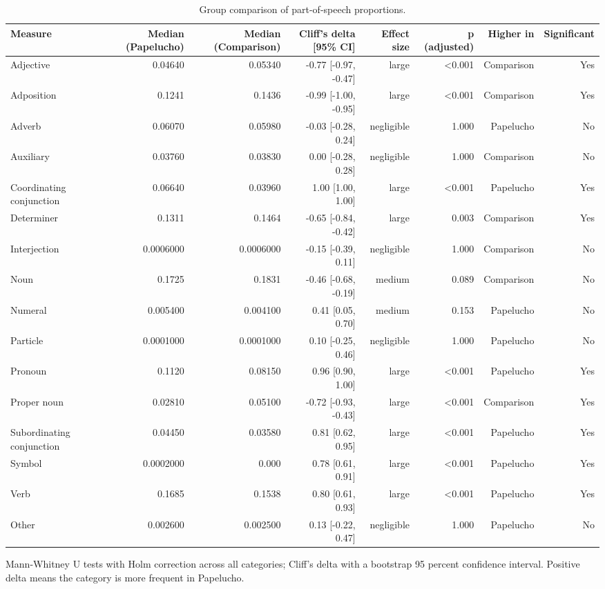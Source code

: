 \begin{table}[htbp]
\centering
\small
\caption{Group comparison of part-of-speech proportions.}
\label{tab:pos-results}
\begin{tabular}{lrrrrrrr}
\toprule
\textbf{Measure} & \textbf{Median (Papelucho)} & \textbf{Median (Comparison)} & \textbf{Cliff's delta [95\% CI]} & \textbf{Effect size} & \textbf{p (adjusted)} & \textbf{Higher in} & \textbf{Significant} \\
\midrule
Adjective & 0.04640 & 0.05340 & -0.77 [-0.97, -0.47] & large & <0.001 & Comparison & Yes \\
Adposition & 0.1241 & 0.1436 & -0.99 [-1.00, -0.95] & large & <0.001 & Comparison & Yes \\
Adverb & 0.06070 & 0.05980 & -0.03 [-0.28, 0.24] & negligible & 1.000 & Papelucho & No \\
Auxiliary & 0.03760 & 0.03830 & 0.00 [-0.28, 0.28] & negligible & 1.000 & Comparison & No \\
Coordinating conjunction & 0.06640 & 0.03960 & 1.00 [1.00, 1.00] & large & <0.001 & Papelucho & Yes \\
Determiner & 0.1311 & 0.1464 & -0.65 [-0.84, -0.42] & large & 0.003 & Comparison & Yes \\
Interjection & 0.0006000 & 0.0006000 & -0.15 [-0.39, 0.11] & negligible & 1.000 & Comparison & No \\
Noun & 0.1725 & 0.1831 & -0.46 [-0.68, -0.19] & medium & 0.089 & Comparison & No \\
Numeral & 0.005400 & 0.004100 & 0.41 [0.05, 0.70] & medium & 0.153 & Papelucho & No \\
Particle & 0.0001000 & 0.0001000 & 0.10 [-0.25, 0.46] & negligible & 1.000 & Papelucho & No \\
Pronoun & 0.1120 & 0.08150 & 0.96 [0.90, 1.00] & large & <0.001 & Papelucho & Yes \\
Proper noun & 0.02810 & 0.05100 & -0.72 [-0.93, -0.43] & large & <0.001 & Comparison & Yes \\
Subordinating conjunction & 0.04450 & 0.03580 & 0.81 [0.62, 0.95] & large & <0.001 & Papelucho & Yes \\
Symbol & 0.0002000 & 0.000 & 0.78 [0.61, 0.91] & large & <0.001 & Papelucho & Yes \\
Verb & 0.1685 & 0.1538 & 0.80 [0.61, 0.93] & large & <0.001 & Papelucho & Yes \\
Other & 0.002600 & 0.002500 & 0.13 [-0.22, 0.47] & negligible & 1.000 & Papelucho & No \\
\bottomrule
\end{tabular}
\vspace{0.5em}
\begin{minipage}{\linewidth}\footnotesize Mann-Whitney U tests with Holm correction across all categories; Cliff's delta with a bootstrap 95 percent confidence interval. Positive delta means the category is more frequent in Papelucho.\end{minipage}
\end{table}

